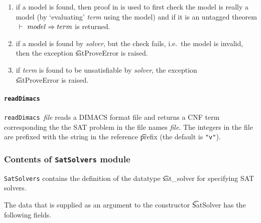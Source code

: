 \begin{enumerate}
\item  if a model is found, then proof in \HOL{} is used to first check the model
is really a model (by `evaluating' {\it term} using the model) and if it
is an untagged theorem $\ \vdash\  model \Rightarrow term$ is returned.

\item if a model is found by {\it solver}, but the \HOL{} check fails, 
i.e.~the model is invalid, then the exception \t{satProveError} is raised.

\item if {\it term} is found to be unsatisfiable by {\it solver},
the exception \\ \t{satProveError} is raised.

\end{enumerate}

\paragraph{\tt readDimacs}${}$\\

{\small{\tt readDimacs}~{\it file}} reads a DIMACS format file and returns
a CNF \HOL{} term corresponding the the SAT problem in the file names {\it file}.
The integers in the file are prefixed with the string in the reference 
\t{prefix} (the default is {\small\verb+"v"+}).


\subsubsection{Contents of {\tt SatSolvers} module}
{\tt SatSolvers} contains the definition of the datatype \t{sat\_solver} for specifying SAT solvers.


The data that is supplied as an argument to the constructor \t{SatSolver}
has the following fields.

\medskip

